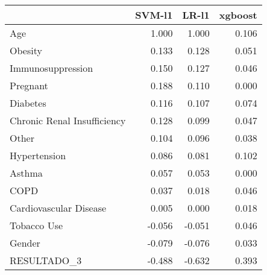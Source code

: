 \begin{tabular}{lrrr}
\toprule
{} &  SVM-l1 &  LR-l1 &  xgboost \\
\midrule
Age                         &   1.000 &  1.000 &    0.106 \\
Obesity                     &   0.133 &  0.128 &    0.051 \\
Immunosuppression           &   0.150 &  0.127 &    0.046 \\
Pregnant                    &   0.188 &  0.110 &    0.000 \\
Diabetes                    &   0.116 &  0.107 &    0.074 \\
Chronic Renal Insufficiency &   0.128 &  0.099 &    0.047 \\
Other                       &   0.104 &  0.096 &    0.038 \\
Hypertension                &   0.086 &  0.081 &    0.102 \\
Asthma                      &   0.057 &  0.053 &    0.000 \\
COPD                        &   0.037 &  0.018 &    0.046 \\
Cardiovascular Disease      &   0.005 &  0.000 &    0.018 \\
Tobacco Use                 &  -0.056 & -0.051 &    0.046 \\
Gender                      &  -0.079 & -0.076 &    0.033 \\
RESULTADO\_3                 &  -0.488 & -0.632 &    0.393 \\
\bottomrule
\end{tabular}
